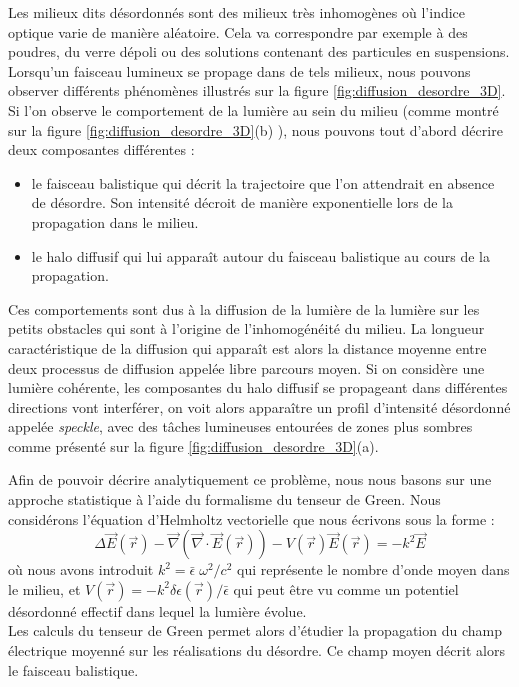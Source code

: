 \documentclass[a4paper,11pt]{article} %
\begin{document}
	Les milieux dits désordonnés sont des milieux très inhomogènes où l'indice optique varie de manière aléatoire. Cela va correspondre par exemple à des poudres, du verre dépoli ou des solutions contenant des particules en suspensions. Lorsqu'un faisceau lumineux se propage dans de tels milieux, nous pouvons observer différents phénomènes illustrés sur la figure \ref{fig:diffusion_desordre_3D}. Si l'on observe le comportement de la lumière au sein du milieu (comme montré sur la figure \ref{fig:diffusion_desordre_3D}(b) ), nous pouvons tout d'abord décrire deux  composantes différentes :
	\begin{itemize}
		\item le faisceau balistique qui décrit la trajectoire que l'on attendrait en absence de désordre. Son intensité décroit de manière exponentielle lors de la propagation dans le milieu.
		\item le halo diffusif qui lui apparaît autour du faisceau balistique au cours de la propagation.
	\end{itemize}
	Ces comportements sont dus à la diffusion de la lumière de la lumière sur les petits obstacles qui sont à l'origine de l'inhomogénéité du milieu. La longueur caractéristique de la diffusion qui apparaît est alors la distance moyenne entre deux processus de diffusion appelée libre parcours moyen. Si on considère une lumière cohérente, les composantes du halo diffusif se propageant dans différentes directions vont interférer, on voit alors apparaître un profil d'intensité désordonné appelée \textit{speckle}, avec des tâches lumineuses entourées de zones plus sombres comme présenté sur la figure \ref{fig:diffusion_desordre_3D}(a).
	
	
	Afin de pouvoir décrire analytiquement ce problème, nous nous basons sur une approche statistique à l'aide du formalisme du tenseur de Green. Nous considérons l'équation d'Helmholtz vectorielle que nous écrivons sous la forme :
	\begin{equation*}
		\Delta \vec{E}(\vec{r}) - \vec{\nabla}(\vec{\nabla} \cdot \vec{E}(\vec{r})) - V(\vec{r}) \vec{E}(\vec{r}) = - k^2 \vec{E}
	\end{equation*}
	où nous avons introduit $ k^2 = \bar{\epsilon} \; \omega^2 / c^2 $ qui représente le nombre d'onde moyen dans le milieu, et $ V(\vec{r}) = - k^2 \delta \epsilon(\vec{r}) / \bar{\epsilon} $ qui peut être vu comme un potentiel désordonné effectif dans lequel la lumière évolue.\\
	
	Les calculs du tenseur de Green permet alors d'étudier la propagation du champ électrique moyenné sur les réalisations du désordre. Ce champ moyen décrit alors le faisceau balistique.
	
\end{document}
